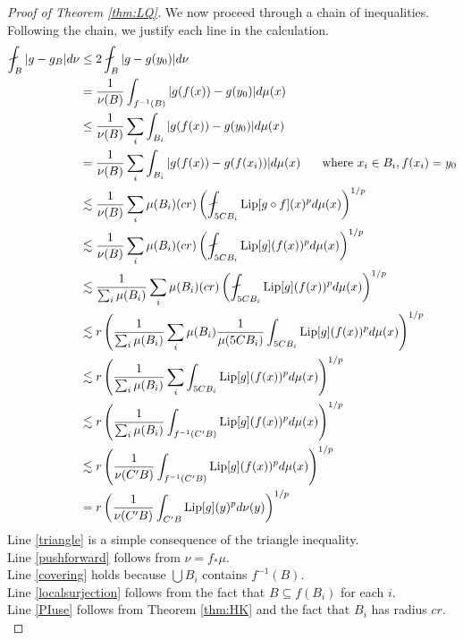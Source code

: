 \documentclass{amsart}
\theoremstyle{plain}
\theoremstyle{definition}
\numberwithin{equation}{section}
\numberwithin{theorem}{section}
\newcommand{\Lip}{\textnormal{Lip}}
\begin{document}
\begin{proof}[Proof of Theorem \ref{thm:LQ}]
We now proceed through a chain of inequalities. Following the chain, we justify each line in the calculation.
\begin{align}
\fint_B |g - g_B| d\nu &\leq 2\fint_B |g - g(y_0)|d\nu\label{triangle}\\ 
&=\frac{1}{\nu(B)} \int_{f^{-1}(B)} |g(f(x)) - g(y_0) | d\mu(x)\label{pushforward}\\
&\leq \frac{1}{\nu(B)} \sum_i \int_{B_i} |g(f(x)) - g(y_0) | d\mu(x)\label{covering}\\
&= \frac{1}{\nu(B)} \sum_i \int_{B_i} |g(f(x)) - g(f(x_i))| d\mu(x) \hspace{0.2in}\text{ where } x_i\in B_i, f(x_i) = y_0 \label{localsurjection}\\
&\lesssim \frac{1}{\nu(B)} \sum_i \mu(B_i)(cr)\left(\fint_{5C B_i} \Lip[g\circ f](x)^p d\mu(x)\right)^{1/p} \label{PIuse}\\
&\lesssim \frac{1}{\nu(B)} \sum_i \mu(B_i)(cr)\left(\fint_{5C B_i} \Lip[g](f(x))^p d\mu(x)\right)^{1/p} \label{Lip}\\
&\lesssim \frac{1}{\sum_i \mu(B_i)} \sum_i \mu(B_i)(cr)\left(\fint_{5C B_i} \Lip[g](f(x))^p d\mu(x)\right)^{1/p} \label{nudoubling1}\\
&\lesssim r  \left(\frac{1}{\sum_i \mu(B_i)} \sum_i \mu(B_i)\frac{1}{\mu(5CB_i)}\int_{5CB_i} \Lip[g](f(x))^p d\mu(x)\right)^{1/p} \label{Jensen}\\
&\lesssim r \left(\frac{1}{\sum_i \mu(B_i)}\sum_i  \int_{5CB_i} \Lip[g](f(x))^p d\mu(x)\right)^{1/p} \label{mudoubling}\\
&\lesssim r  \left(\frac{1}{\sum_i \mu(B_i)} \int_{f^{-1}(C'B)} \Lip[g](f(x))^p d\mu(x)\right)^{1/p}\label{bigpreimage}\\
&\lesssim r \left(\frac{1}{\nu(C'B)} \int_{f^{-1}(C'B)} \Lip[g](f(x))^p d\mu(x)\right)^{1/p}\label{nudoubling2}\\
&= r  \left(\frac{1}{\nu(C'B)} \int_{C'B} \Lip[g](y)^p d\nu(y)\right)^{1/p}\label{lastline}
\end{align}
Line \eqref{triangle} is a simple consequence of the triangle inequality.\\
Line \eqref{pushforward} follows from $\nu = f_*\mu$.\\ 
Line \eqref{covering} holds because $\bigcup B_i$ contains $f^{-1}(B)$.\\ 
Line \eqref{localsurjection} follows from the fact that $B\subseteq f(B_i)$ for each $i$. \\ Line \eqref{PIuse} follows from Theorem \ref{thm:HK} and the fact that $B_i$ has radius $cr$.\\ 

\end{proof}
\end{document}
